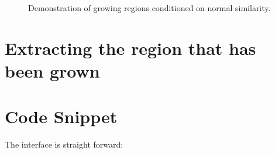 \documentclass{InsightArticle}
\begin{document}
\begin{figure}[H]
\centering
{}
\caption{Demonstration of growing regions conditioned on normal similarity.}
\label{fig:Demo}
\end{figure}

\section{Extracting the region that has been grown}

\section{Code Snippet}
The interface is straight forward:
\end{document}
